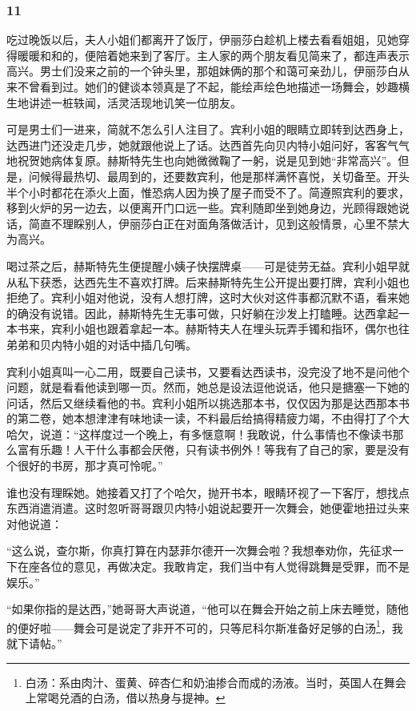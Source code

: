 \subsubsection*{11}


\par 吃过晚饭以后，夫人小姐们都离开了饭厅，伊丽莎白趁机上楼去看看姐姐，见她穿得暖暖和和的，便陪着她来到了客厅。主人家的两个朋友看见简来了，都连声表示高兴。男士们没来之前的一个钟头里，那姐妹俩的那个和蔼可亲劲儿，伊丽莎白从来不曾看到过。她们的健谈本领真是了不起，能绘声绘色地描述一场舞会，妙趣横生地讲述一桩轶闻，活灵活现地讥笑一位朋友。
\par 可是男士们一进来，简就不怎么引人注目了。宾利小姐的眼睛立即转到达西身上，达西进门还没走几步，她就跟他说上了话。达西首先向贝内特小姐问好，客客气气地祝贺她病体复原。赫斯特先生也向她微微鞠了一躬，说是见到她“非常高兴”。但是，问候得最热切、最周到的，还要数宾利，他是那样满怀喜悦，关切备至。开头半个小时都花在添火上面，惟恐病人因为换了屋子而受不了。简遵照宾利的要求，移到火炉的另一边去，以便离开门口远一些。宾利随即坐到她身边，光顾得跟她说话，简直不理睬别人，伊丽莎白正在对面角落做活计，见到这般情景，心里不禁大为高兴。
\par 喝过茶之后，赫斯特先生便提醒小姨子快摆牌桌——可是徒劳无益。宾利小姐早就从私下获悉，达西先生不喜欢打牌。后来赫斯特先生公开提出要打牌，宾利小姐也拒绝了。宾利小姐对他说，没有人想打牌，这时大伙对这件事都沉默不语，看来她的确没有说错。因此，赫斯特先生无事可做，只好躺在沙发上打瞌睡。达西拿起一本书来，宾利小姐也跟着拿起一本。赫斯特夫人在埋头玩弄手镯和指环，偶尔也往弟弟和贝内特小姐的对话中插几句嘴。
\par 宾利小姐真叫一心二用，既要自己读书，又要看达西读书，没完没了地不是问他个问题，就是看看他读到哪一页。然而，她总是设法逗他说话，他只是搪塞一下她的问话，然后又继续看他的书。宾利小姐所以挑选那本书，仅仅因为那是达西那本书的第二卷，她本想津津有味地读一读，不料最后给搞得精疲力竭，不由得打了个大哈欠，说道：“这样度过一个晚上，有多惬意啊！我敢说，什么事情也不像读书那么富有乐趣！人干什么事都会厌倦，只有读书例外！等我有了自己的家，要是没有个很好的书房，那才真可怜呢。”
\par 谁也没有理睬她。她接着又打了个哈欠，抛开书本，眼睛环视了一下客厅，想找点东西消遣消遣。这时忽听哥哥跟贝内特小姐说起要开一次舞会，她便霍地扭过头来对他说道：
\par “这么说，查尔斯，你真打算在内瑟菲尔德开一次舞会啦？我想奉劝你，先征求一下在座各位的意见，再做决定。我敢肯定，我们当中有人觉得跳舞是受罪，而不是娱乐。”
\par “如果你指的是达西，”她哥哥大声说道，“他可以在舞会开始之前上床去睡觉，随他的便好啦——舞会可是说定了非开不可的，只等尼科尔斯准备好足够的白汤\footnote{白汤：系由肉汁、蛋黄、碎杏仁和奶油掺合而成的汤液。当时，英国人在舞会上常喝兑酒的白汤，借以热身与提神。}，我就下请帖。”
